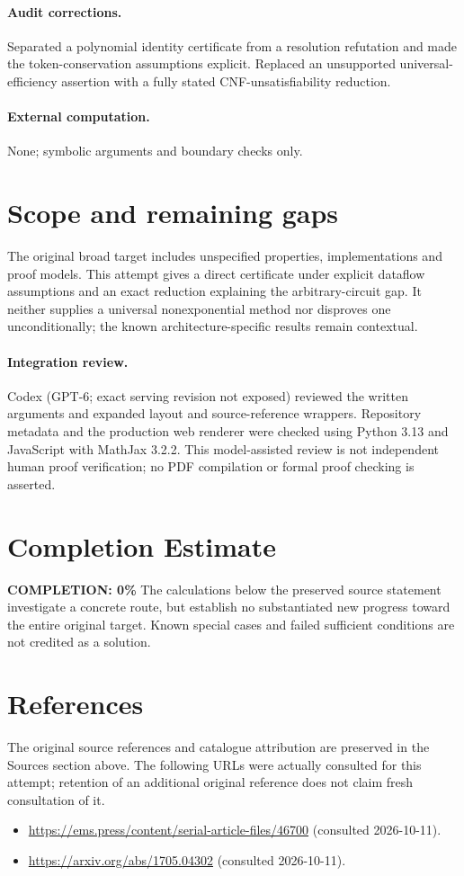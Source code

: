 \documentclass[11pt]{article}
\begin{document}
\paragraph{Audit corrections.} Separated a polynomial identity certificate from a resolution refutation and made the token-conservation assumptions explicit. Replaced an unsupported universal-efficiency assertion with a fully stated CNF-unsatisfiability reduction.
\paragraph{External computation.} None; symbolic arguments and boundary checks only.
\section{Scope and remaining gaps}
The original broad target includes unspecified properties, implementations and proof models. This attempt gives a direct certificate under explicit dataflow assumptions and an exact reduction explaining the arbitrary-circuit gap. It neither supplies a universal nonexponential method nor disproves one unconditionally; the known architecture-specific results remain contextual.
\paragraph{Integration review.} Codex (GPT-6; exact serving revision not exposed) reviewed the written arguments and expanded layout and source-reference wrappers. Repository metadata and the production web renderer were checked using Python 3.13 and JavaScript with MathJax 3.2.2. This model-assisted review is not independent human proof verification; no PDF compilation or formal proof checking is asserted.

\section{Completion Estimate}
\noindent\textbf{COMPLETION: 0\%}
The calculations below the preserved source statement investigate a concrete route,
but establish no substantiated new progress toward the entire original target.
Known special cases and failed sufficient conditions are not credited as a solution.
\section{References}
The original source references and catalogue attribution are preserved in the
Sources section above. The following URLs were actually consulted for this attempt;
retention of an additional original reference does not claim fresh consultation of it.
\begin{itemize}
\item \url{https://ems.press/content/serial-article-files/46700} (consulted 2026-10-11). 
\item \url{https://arxiv.org/abs/1705.04302} (consulted 2026-10-11). 
\end{itemize}
\end{document}
